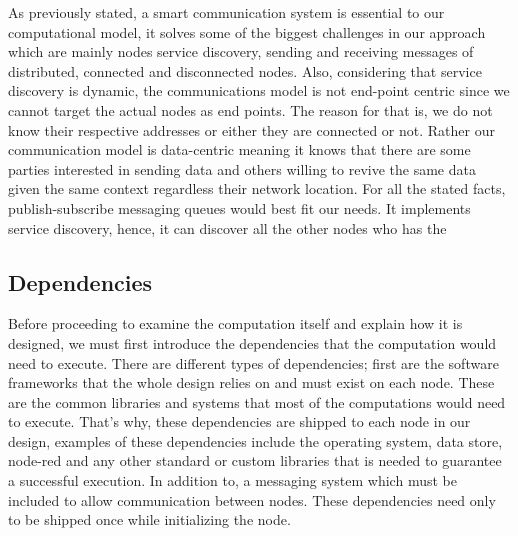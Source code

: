 As previously stated, a smart communication system is essential to our computational model, it solves some of the biggest challenges in our approach which are mainly nodes service discovery, sending and receiving messages of distributed, connected and disconnected nodes. Also, considering that service discovery is dynamic, the communications model is not end-point centric since we cannot target the actual nodes as end points. The reason for that is, we do not know their respective addresses or either they are connected or not. Rather our communication model is data-centric meaning it knows that there are some parties interested in sending data and others willing to revive the same data given the same context regardless their network location.
For all the stated facts, publish-subscribe messaging queues would best fit our needs. It implements service discovery, hence, it can discover all the other nodes who has the 



\newpage


\subsection{Dependencies}

Before proceeding to examine the computation itself and explain how it is designed, we must first introduce the dependencies that the computation would need to execute. There are different types of dependencies; first are the software frameworks that the whole design relies on and must exist on each node. These are the common libraries and systems that most of the computations would need to execute. That's why, these dependencies are shipped to each node in our design, examples of these dependencies include the operating system, data store, node-red and any other standard or custom libraries that is needed to guarantee a successful execution. In addition to, a messaging system which must be included to allow communication between nodes. These dependencies need only to be shipped once while initializing the node.

